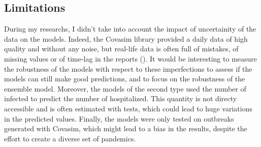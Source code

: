 \subsection{Limitations}

During my researchs, I didn't take into account the impact of uncertainity of the data on the models. 
Indeed, the Covasim library provided a daily data of high quality and without any noise, but
real-life data is often full of mistakes, of missing values or of time-lag in the reports (\cite{greene_Nowcasting}).
It would be interesting to measure the robustness of the models with respect to these imperfections to assess if the models can still make good predictions, and to focus on the robustness of the ensemble model. 
Moreover, the models of the second type used the number of infected to predict the number of hospitalized. 
This quantity is not directy accessible and is often estimated with tests, which could lead to huge variations in the predicted values.  
Finally, the models were only tested on outbreaks generated with Covasim, which might lead to a bias in the results, despite the effort to create a diverse set of pandemics. 
